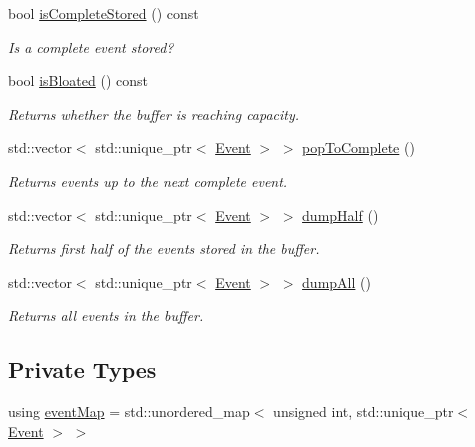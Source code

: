 \begin{DoxyCompactItemize}
bool \hyperlink{class_thread_safe_event_map_a9fb58083137d147811de5b93f991d044}{is\+Complete\+Stored} () const
\begin{DoxyCompactList}\small\item\em Is a complete event stored? \end{DoxyCompactList}\item 
bool \hyperlink{class_thread_safe_event_map_a203143086874b97171101871ba2c4f6f}{is\+Bloated} () const
\begin{DoxyCompactList}\small\item\em Returns whether the buffer is reaching capacity. \end{DoxyCompactList}\item 
std\+::vector$<$ std\+::unique\+\_\+ptr$<$ \hyperlink{class_event}{Event} $>$ $>$ \hyperlink{class_thread_safe_event_map_adc6c905693e3b9b54671299e7610d5b6}{pop\+To\+Complete} ()
\begin{DoxyCompactList}\small\item\em Returns events up to the next complete event. \end{DoxyCompactList}\item 
std\+::vector$<$ std\+::unique\+\_\+ptr$<$ \hyperlink{class_event}{Event} $>$ $>$ \hyperlink{class_thread_safe_event_map_a655bf86c67d1e8d0e8276b012f5fab8d}{dump\+Half} ()
\begin{DoxyCompactList}\small\item\em Returns first half of the events stored in the buffer. \end{DoxyCompactList}\item 
std\+::vector$<$ std\+::unique\+\_\+ptr$<$ \hyperlink{class_event}{Event} $>$ $>$ \hyperlink{class_thread_safe_event_map_af65f8dbd177f3db92d227b86839c275d}{dump\+All} ()
\begin{DoxyCompactList}\small\item\em Returns all events in the buffer. \end{DoxyCompactList}\end{DoxyCompactItemize}
\subsection*{Private Types}
\begin{DoxyCompactItemize}
\item 
using \hyperlink{class_thread_safe_event_map_a069c80cec7636a015d8a69574157d8d2}{event\+Map} = std\+::unordered\+\_\+map$<$ unsigned int, std\+::unique\+\_\+ptr$<$ \hyperlink{class_event}{Event} $>$ $>$
\end{DoxyCompactItemize}
